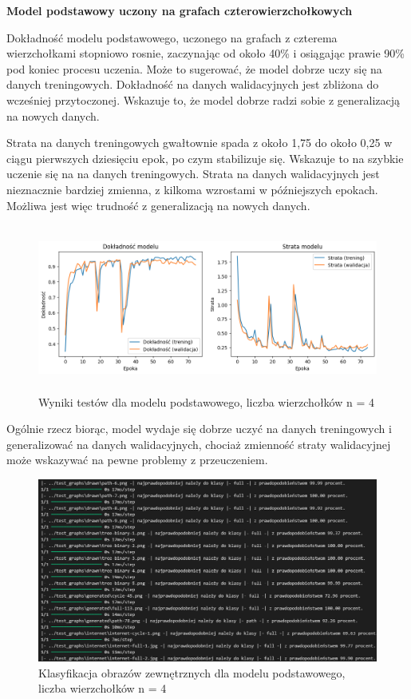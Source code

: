 \textbf{Model podstawowy uczony na grafach czterowierzchołkowych}

Dokładność modelu podstawowego, uczonego na grafach z czterema wierzchołkami stopniowo rosnie,
zaczynając od około 40\% i osiągając prawie 90\% pod koniec procesu uczenia.
Może to sugerować, że model dobrze uczy się na danych treningowych.
Dokładność na danych walidacyjnych jest zbliżona do wcześniej przytoczonej.
Wskazuje to, że model dobrze radzi sobie z generalizacją na nowych danych.

Strata na danych treningowych gwałtownie spada z około 1,75 do około 0,25 w ciągu pierwszych dziesięciu epok,
po czym stabilizuje się.
Wskazuje to na szybkie uczenie się na na danych treningowych.
Strata na danych walidacyjnych jest nieznacznie bardziej zmienna,
z kilkoma wzrostami w późniejszych epokach.
Możliwa jest więc trudność z generalizacją na nowych danych.

\begin{figure}[ht]
	\centering
	\includegraphics[height=5.5cm]{resources/tests/images/v3/base4_img.png}
	\caption{Wyniki testów dla modelu podstawowego, liczba wierzchołków n = 4}
	\label{Fig:tests-base-1a}
\end{figure}
\FloatBarrier

Ogólnie rzecz biorąc, model wydaje się dobrze uczyć na danych treningowych i generalizować na danych walidacyjnych,
chociaż zmienność straty walidacyjnej może wskazywać na pewne problemy z przeuczeniem.

\begin{figure}[ht]
	\centering
	\includegraphics[width=14cm]{resources/tests/images/v3/base4_txt.png}
	\caption{Klasyfikacja obrazów zewnętrznych dla modelu podstawowego, liczba wierzchołków n = 4}
	\label{Fig:tests-base-1b}
\end{figure}
\FloatBarrier

